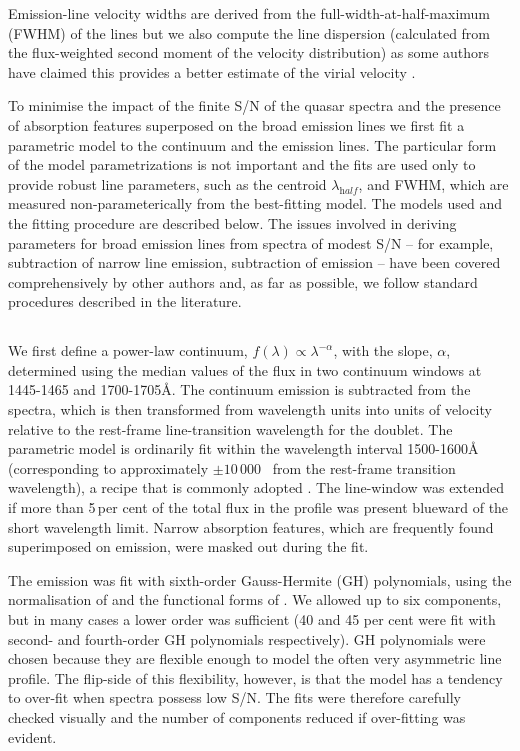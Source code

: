 Emission-line velocity widths are derived from the full-width-at-half-maximum (FWHM) of the lines but we also compute the line dispersion (calculated from the flux-weighted second moment of the velocity distribution) as some authors have claimed this provides a better estimate of the virial velocity \citep{denney13}. 

To minimise the impact of the finite S/N of the quasar spectra and the presence of absorption features superposed on the broad emission lines we first fit a parametric model to the continuum and the emission lines. 
The particular form of the model parametrizations is not important and the fits are used only to provide robust line parameters, such as the centroid $\lambda_{\mathrm half}$, and FWHM, which are measured non-parameterically from the best-fitting model. 
The models used and the fitting procedure are described below. 
The issues involved in deriving parameters for broad emission lines from spectra of modest S/N -- for example, subtraction of narrow line emission, subtraction of  emission -- have been covered comprehensively by other authors \citep[e.g.][]{shen11,shen12,denney13,shen16a} and, as far as possible, we follow standard procedures described in the literature. 

\subsection{}
\label{sec:civ}

We first define a power-law continuum, $f(\lambda) \propto \lambda^{-\alpha}$, with the slope, $\alpha$, determined using the median values of the flux in two continuum windows at 1445-1465 and 1700-1705\AA. 
The continuum emission is subtracted from the spectra, which is then transformed from wavelength units into units of velocity relative to the rest-frame line-transition wavelength for the  doublet.
The parametric model is ordinarily fit within the wavelength interval 1500-1600\AA\, (corresponding to approximately $\pm 10\,000$ \kms\, from the rest-frame transition wavelength), a recipe that is commonly adopted \citep[e.g.][]{denney13}. 
The line-window was extended if more than 5\,per cent of the total flux in the profile was present blueward of the short wavelength limit. 
Narrow absorption features, which are frequently found superimposed on  emission, were masked out during the fit. 

The  emission was fit with sixth-order Gauss-Hermite (GH) polynomials, using the normalisation of \citet{marel93} and the functional forms of \citet{cappellari02}. 
We allowed up to six components, but in many cases a lower order was sufficient (40 and 45 per cent were fit with second- and fourth-order GH polynomials respectively).
GH polynomials were chosen because they are flexible enough to model the often very asymmetric  line profile. 
The flip-side of this flexibility, however, is that the model has a tendency to over-fit when spectra possess low S/N. 
The fits were therefore carefully checked visually and the number of components reduced if over-fitting was evident.

